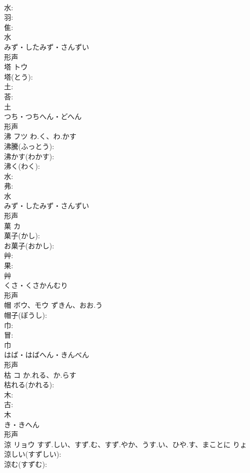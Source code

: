 \documentclass[8pt]{extreport}
\begin{document}
\begin{CJK}{UTF8}{min}
\\	水: 
\\	羽: 
\\	隹: 
\\	水	
\\	みず・したみず・さんずい	
\\	形声 
\\	塔	トウ			
\\	塔(とう): 
\\	土: 
\\	荅: 
\\	土	
\\	つち・つちへん・どへん	
\\	形声 
\\	沸	フツ	わ.く、わ.かす		
\\	沸騰(ふっとう): 
\\	沸かす(わかす): 
\\	沸く(わく): 
\\	水: 
\\	弗: 
\\	水	
\\	みず・したみず・さんずい	
\\	形声 
\\	菓	カ			
\\	菓子(かし): 
\\	お菓子(おかし): 
\\	艸: 
\\	果: 
\\	艸	
\\	くさ・くさかんむり	
\\	形声 
\\	帽	ボウ、モウ	ずきん、おお.う		
\\	帽子(ぼうし): 
\\	巾: 
\\	冒: 
\\	巾	
\\	はば・はばへん・きんべん	
\\	形声 
\\	枯	コ	か.れる、か.らす		
\\	枯れる(かれる): 
\\	木: 
\\	古: 
\\	木	
\\	き・きへん	
\\	形声 
\\	涼	リョウ	すず.しい、すず.む、すず.やか、うす.い、ひや.す、まことに	りょ	
\\	涼しい(すずしい): 
\\	涼む(すずむ): 

\end{CJK}
\end{document}
